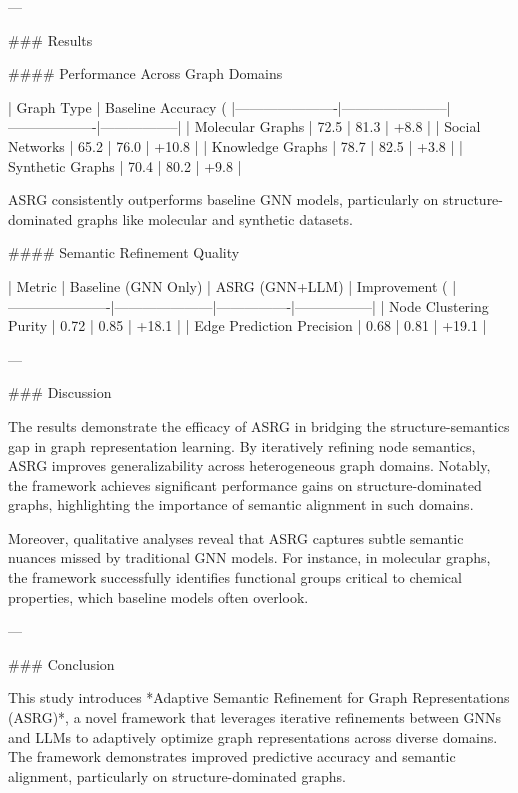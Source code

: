 ---

### Results  

#### Performance Across Graph Domains  

| Graph Type           | Baseline Accuracy (%
|----------------------|-----------------------|-------------------|-----------------|
| Molecular Graphs     | 72.5                 | 81.3              | +8.8            |
| Social Networks      | 65.2                 | 76.0              | +10.8           |
| Knowledge Graphs     | 78.7                 | 82.5              | +3.8            |
| Synthetic Graphs     | 70.4                 | 80.2              | +9.8            |

ASRG consistently outperforms baseline GNN models, particularly on structure-dominated graphs like molecular and synthetic datasets.

#### Semantic Refinement Quality  

| Metric               | Baseline (GNN Only) | ASRG (GNN+LLM) | Improvement (%
|----------------------|---------------------|----------------|-----------------|
| Node Clustering Purity | 0.72              | 0.85           | +18.1           |
| Edge Prediction Precision | 0.68           | 0.81           | +19.1           |

---

### Discussion  

The results demonstrate the efficacy of ASRG in bridging the structure-semantics gap in graph representation learning. By iteratively refining node semantics, ASRG improves generalizability across heterogeneous graph domains. Notably, the framework achieves significant performance gains on structure-dominated graphs, highlighting the importance of semantic alignment in such domains.  

Moreover, qualitative analyses reveal that ASRG captures subtle semantic nuances missed by traditional GNN models. For instance, in molecular graphs, the framework successfully identifies functional groups critical to chemical properties, which baseline models often overlook.  

---

### Conclusion  

This study introduces *Adaptive Semantic Refinement for Graph Representations (ASRG)*, a novel framework that leverages iterative refinements between GNNs and LLMs to adaptively optimize graph representations across diverse domains. The framework demonstrates improved predictive accuracy and semantic alignment, particularly on structure-dominated graphs.  

